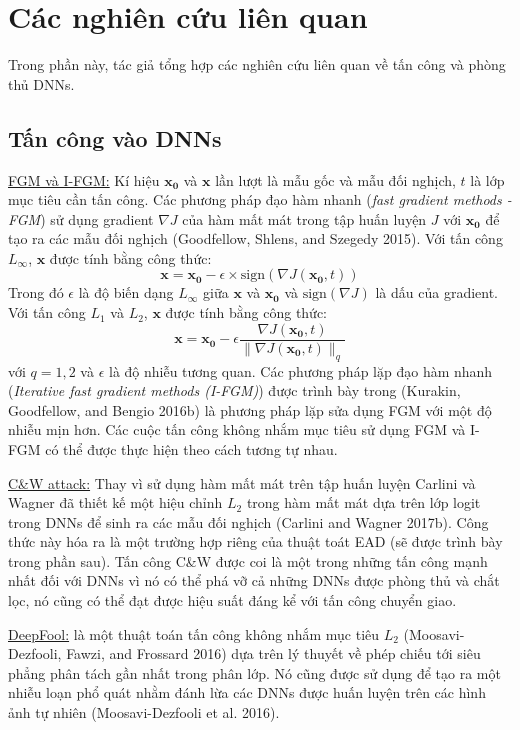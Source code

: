 \chapter{Các nghiên cứu liên quan}
Trong phần này, tác giả tổng hợp các nghiên cứu liên quan về tấn công và phòng thủ DNNs.

\section{Tấn công vào DNNs}
\underline{FGM và I-FGM:} Kí hiệu $\mathbf{x_0}$ và $\mathbf{x}$ lần lượt là mẫu gốc và mẫu đối nghịch,
$t$ là lớp mục tiêu cần tấn công. Các phương pháp đạo hàm nhanh (\textit{fast gradient 
methods - FGM}) sử dụng gradient $\nabla J$ của hàm mất mát trong tập huấn luyện $J$ với $\mathbf{x_0}$
để tạo ra các mẫu đối nghịch (Goodfellow, Shlens, and Szegedy 2015). Với tấn công $L_{\infty}$, 
$\mathbf{x}$ được tính bằng công thức:
\begin{equation}
    \mathbf{x} = \mathbf{x_0} - \epsilon \times \text{sign}(\nabla J(\mathbf{x_0}, t))
\end{equation}
Trong đó $\epsilon$ là độ biến dạng $L_{\infty}$ giữa $\mathbf{x}$ và $\mathbf{x_0}$ và 
$\text{sign}(\nabla J)$ là dấu của gradient. Với tấn công $L_1$ và $L_2$, $\mathbf{x}$ 
được tính bằng công thức:
\begin{equation}
    \mathbf{x} = \mathbf{x_0} - \epsilon \frac{\nabla J(\mathbf{x_0}, t)}
    {\lVert \nabla J(\mathbf{x_0}, t) \rVert _q}
\end{equation}
với $q = 1,2$ và $\epsilon$ là độ nhiễu tương quan. Các phương pháp lặp đạo hàm nhanh 
(\textit{Iterative fast gradient methods (I-FGM)}) được trình bày trong (Kurakin, Goodfellow, 
and Bengio 2016b) là phương pháp lặp sửa dụng FGM với một độ nhiễu mịn hơn. Các cuộc tấn công 
không nhắm mục tiêu sử dụng FGM và I-FGM có thể được thực hiện theo cách tương tự nhau. 

\underline{C\&W attack:} Thay vì sử dụng hàm mất mát trên tập huấn luyện Carlini và Wagner
đã thiết kế  một hiệu chỉnh $L_2$ trong hàm mất mát dựa trên lớp logit trong DNNs để sinh 
ra các mẫu đối nghịch (Carlini and Wagner 2017b). Công thức này hóa ra là một trường hợp riêng của 
thuật toát EAD (sẽ được trình bày trong phần sau). Tấn công C\&W được coi 
là một trong những tấn công mạnh nhất đối với DNNs vì nó có thể phá vỡ cả những DNNs được 
phòng thủ và chắt lọc, nó cũng có thể đạt được hiệu suất đáng kể với tấn công chuyển giao. 

\underline{DeepFool:} là một thuật toán tấn công không nhắm mục tiêu $L_2$ (Moosavi-Dezfooli, 
Fawzi, and Frossard 2016) dựa trên lý thuyết về phép chiếu tới siêu phẳng phân tách gần nhất
trong phân lớp. Nó cũng được sử dụng để tạo ra một nhiễu loạn phổ quát nhằm đánh lừa 
các DNNs được huấn luyện trên các hình ảnh tự nhiên (Moosavi-Dezfooli et al. 2016).

